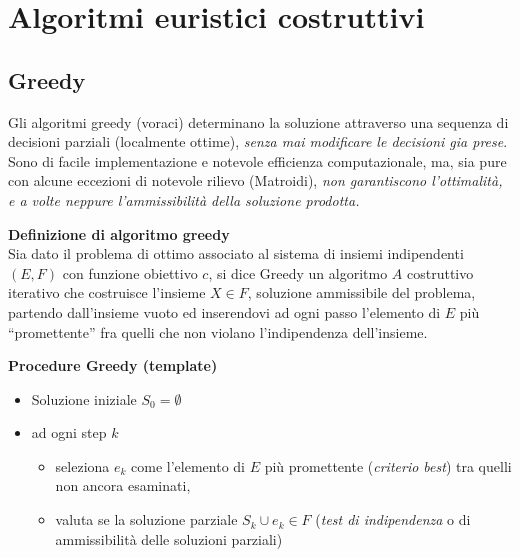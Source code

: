 \documentclass[9pt]{beamer}
\begin{document}
\begin{frame}[allowframebreaks]{\subsecname}
\end{frame}


\section{Algoritmi euristici costruttivi}

\subsection{Greedy}
\begin{frame}[allowframebreaks]{\subsecname}

Gli algoritmi greedy (voraci) determinano la soluzione attraverso una sequenza di decisioni parziali (localmente ottime), \emph{senza mai modificare le decisioni gia prese}. \\

Sono di facile implementazione e notevole efficienza computazionale, ma, sia pure con alcune eccezioni di notevole rilievo (Matroidi), \emph{non garantiscono l'ottimalità, e a volte neppure l’ammissibilità della soluzione prodotta.}

\textbf{Definizione di algoritmo greedy} \\
Sia dato il problema di ottimo associato al sistema di insiemi indipendenti $(E,F)$ con funzione obiettivo $c$, si dice Greedy un algoritmo $A$ costruttivo iterativo che costruisce l'insieme $X \in F$, soluzione ammissibile del problema, partendo dall'insieme vuoto ed inserendovi ad ogni passo l’elemento di $E$ più “promettente” fra quelli che non violano l’indipendenza dell'insieme.

\framebreak

\textbf{Procedure Greedy  (template)}

	\begin{itemize}
	
	\item
	Soluzione iniziale $S_0 = \emptyset$
	
	\item
	ad ogni step $k$
	\begin{itemize}
		\item
		seleziona $e_k$ come l’elemento di $E$ più promettente (\emph{criterio best}) tra quelli non ancora esaminati, 
		\item
		valuta se la soluzione parziale $S_k \cup e_k \in F$ (\emph{test di indipendenza} o di ammissibilità delle soluzioni parziali)
	\end{itemize}
	

\end{itemize}
\end{frame}
\end{document}
